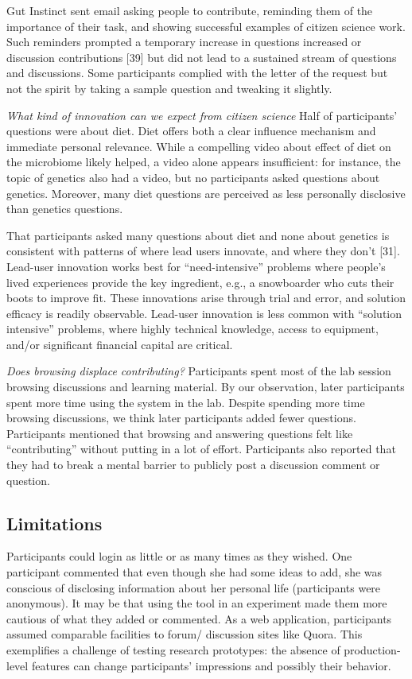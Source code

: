 Gut Instinct sent email asking people to contribute, reminding them of the importance of their task, and showing successful examples of citizen science work. Such reminders 
prompted a temporary increase in questions increased or discussion contributions [39] but did not lead to a sustained stream of questions and discussions. Some participants complied with the letter of the request but not the spirit by taking a sample question and tweaking it slightly.

\textit{What kind of innovation can we expect from citizen science}
Half of participants’ questions were about diet. Diet offers both a clear influence mechanism and immediate personal relevance. While a compelling video about effect of diet on the microbiome likely helped, a video alone appears insufficient: for instance, the topic of genetics also had a video, but no participants asked questions about genetics. Moreover, many diet questions are perceived as less personally disclosive than genetics questions.
 
That participants asked many questions about diet and none about genetics is consistent with patterns of where lead users innovate, and where they don’t [31]. Lead-user innovation works best for “need-intensive” problems where people’s lived experiences provide the key ingredient, e.g., a snowboarder who cuts their boots to improve fit. These innovations arise through trial and error, and solution efficacy is readily observable. Lead-user innovation is less common with “solution intensive” problems, where highly technical knowledge, access to equipment, and/or significant financial capital are critical. 
 
\textit{Does browsing displace contributing?}
Participants spent most of the lab session browsing discussions and learning material. By our observation, later participants spent more time using the system in the lab. Despite spending more time browsing discussions, we think later participants added fewer questions. Participants mentioned that browsing and answering questions felt like “contributing” without putting in a lot of effort. Participants also reported that they had to break a mental barrier to publicly post a discussion comment or question. 

\subsection{Limitations}
Participants could login as little or as many times as they wished. One participant commented that even though she had some ideas to add, she was conscious of disclosing information about her personal life (participants were anonymous). It may be that using the tool in an experiment made them more cautious of what they added or commented.
As a web application, participants assumed comparable facilities to forum/ discussion sites like Quora. This exemplifies a challenge of testing research prototypes: the absence of production-level features can change participants’ impressions and possibly their behavior.


